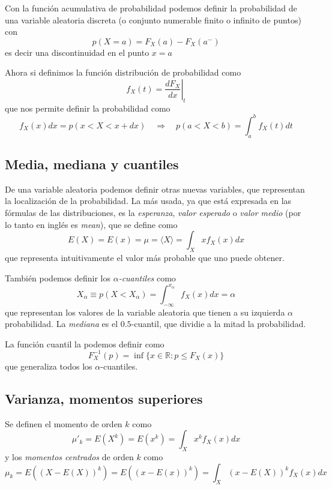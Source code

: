 \documentclass{article}
\numberwithin{equation}{section} %
\begin{document}
Con la función acumulativa de probabilidad podemos definir la probabilidad de una variable aleatoria discreta (o conjunto numerable finito o infinito de puntos) con
\begin{equation}
p(X = a) = F_X(a) - F_X(a^{-})
\end{equation}
es decir una discontinuidad en el punto $x = a$

Ahora si definimos la función distribución de probabilidad como
\begin{equation}
f_X(t) = \left.\frac{dF_X}{dx}\right|_t
\end{equation}
que nos permite definir la probabilidad como
\begin{equation}
f_X(x) dx = p(x < X < x + dx) \quad \Rightarrow \quad p(a < X < b) = \int_{a}^{b} f_X(t) dt
\end{equation}
\subsection{Media, mediana y cuantiles}
De una variable aleatoria podemos definir otras nuevas variables, que representan la localización de la probabilidad. La más usada, ya que está expresada en las fórmulas de las distribuciones, es la \emph{esperanza}, \emph{valor esperado} o \emph{valor medio} (por lo tanto en inglés es \emph{mean}), que se define como
\begin{equation}
E(X) = E(x) = \mu = \langle X \rangle = \int_{X} x f_X(x) dx
\end{equation}
que representa intuitivamente el valor más probable que uno puede obtener.

También podemos definir los \emph{$\alpha$-cuantiles} como
\begin{equation}
X_\alpha \equiv p(X < X_\alpha) = \int_{-\infty}^{x_\alpha} f_X(x)dx = \alpha 
\end{equation}
que representan los valores de la variable aleatoria que tienen a su izquierda $\alpha$ probabilidad. La \emph{mediana} es el $0.5$-cuantil, que dividie a la mitad la probabilidad.

La función cuantil la podemos definir como
\begin{equation}
F^{-1}_X(p) = \inf\{x \in \mathbb{R} : p \leq F_X(x)\}
\end{equation}
que generaliza todos los $\alpha$-cuantiles.
\subsection{Varianza, momentos superiores}
Se definen el momento de orden $k$ como
\begin{equation}
\mu'_k = E(X^k) = E(x^k) = \int_{X} x^k f_X(x) dx
\end{equation}
y los \emph{momentos centrados} de orden $k$ como
\begin{equation}
\mu_k = E((X - E(X))^k) = E((x - E(x))^k) = \int_{X} (x - E(X))^k f_X(x) dx
\end{equation}
\end{document}
